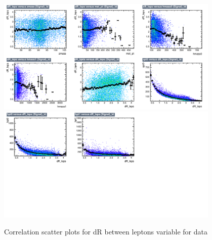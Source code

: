 \begin{figure}[!htb]%
\centering
\includegraphics[width=0.95\textwidth]{figures/CRDY/dataset/plots/correlationscatter_dR_leps__Id_c1.pdf}
\includegraphics[width=0.95\textwidth]{figures/CRDY/dataset/plots/correlationscatter_dR_leps__Id_c2.pdf}
\caption{ Correlation scatter plots for dR between leptons variable for data}%
\label{fig:correlations_CRDY_drleps_S}                                                       
\end{figure}



